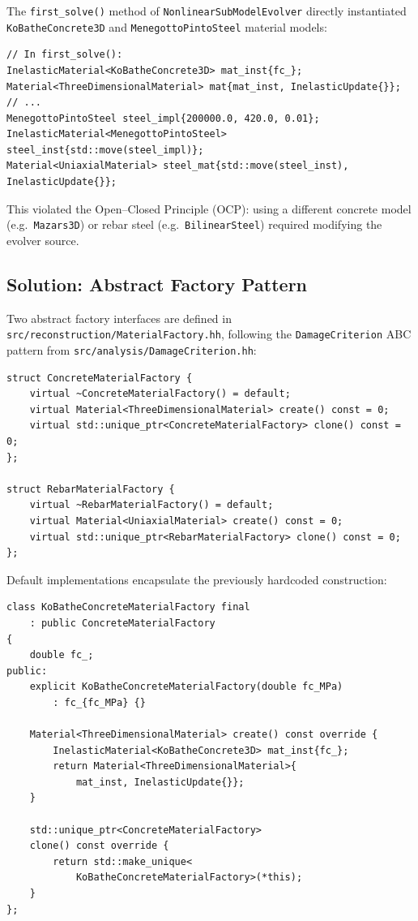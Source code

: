 The \texttt{first\_solve()} method of
\texttt{NonlinearSubModelEvolver} directly instantiated
\texttt{KoBatheConcrete3D} and \texttt{MenegottoPintoSteel} material
models:

\begin{lstlisting}[caption={Hardcoded material construction (before).}]
// In first_solve():
InelasticMaterial<KoBatheConcrete3D> mat_inst{fc_};
Material<ThreeDimensionalMaterial> mat{mat_inst, InelasticUpdate{}};
// ...
MenegottoPintoSteel steel_impl{200000.0, 420.0, 0.01};
InelasticMaterial<MenegottoPintoSteel> steel_inst{std::move(steel_impl)};
Material<UniaxialMaterial> steel_mat{std::move(steel_inst), InelasticUpdate{}};
\end{lstlisting}

This violated the Open--Closed Principle (OCP): using a different
concrete model (e.g.\ \texttt{Mazars3D}) or rebar steel (e.g.\
\texttt{BilinearSteel}) required modifying the evolver source.

\subsection{Solution: Abstract Factory Pattern}
\label{sec:refactor-factory-design}

Two abstract factory interfaces are defined in
\texttt{src/reconstruction/MaterialFactory.hh}, following the
\texttt{DamageCriterion} ABC pattern from
\texttt{src/analysis/DamageCriterion.hh}:

\begin{lstlisting}[caption={Material factory ABCs.},
                   label={lst:material-factories}]
struct ConcreteMaterialFactory {
    virtual ~ConcreteMaterialFactory() = default;
    virtual Material<ThreeDimensionalMaterial> create() const = 0;
    virtual std::unique_ptr<ConcreteMaterialFactory> clone() const = 0;
};

struct RebarMaterialFactory {
    virtual ~RebarMaterialFactory() = default;
    virtual Material<UniaxialMaterial> create() const = 0;
    virtual std::unique_ptr<RebarMaterialFactory> clone() const = 0;
};
\end{lstlisting}

Default implementations encapsulate the previously hardcoded
construction:

\begin{lstlisting}[caption={Default factory implementations.},
                   label={lst:default-factories}]
class KoBatheConcreteMaterialFactory final
    : public ConcreteMaterialFactory
{
    double fc_;
public:
    explicit KoBatheConcreteMaterialFactory(double fc_MPa)
        : fc_{fc_MPa} {}

    Material<ThreeDimensionalMaterial> create() const override {
        InelasticMaterial<KoBatheConcrete3D> mat_inst{fc_};
        return Material<ThreeDimensionalMaterial>{
            mat_inst, InelasticUpdate{}};
    }

    std::unique_ptr<ConcreteMaterialFactory>
    clone() const override {
        return std::make_unique<
            KoBatheConcreteMaterialFactory>(*this);
    }
};
\end{lstlisting}

